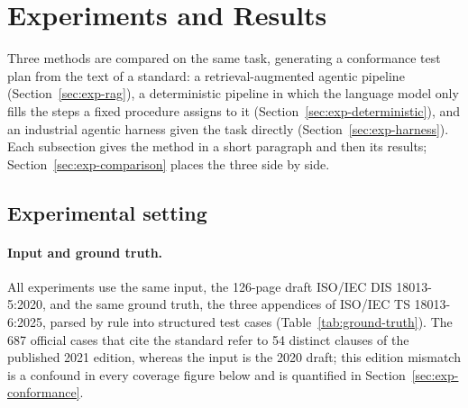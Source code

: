 \providecommand{\tbd}{\textit{tbd}}

\section{Experiments and Results}
\label{sec:experiments}

Three methods are compared on the same task, generating a conformance test
plan from the text of a standard: a retrieval-augmented agentic pipeline
(Section~\ref{sec:exp-rag}), a deterministic pipeline in which the language
model only fills the steps a fixed procedure assigns to it
(Section~\ref{sec:exp-deterministic}), and an industrial agentic harness
given the task directly (Section~\ref{sec:exp-harness}). Each subsection
gives the method in a short paragraph and then its results;
Section~\ref{sec:exp-comparison} places the three side by side.

\subsection{Experimental setting}
\label{sec:exp-setting}

\paragraph{Input and ground truth.}
All experiments use the same input, the 126-page draft ISO/IEC DIS
18013-5:2020, and the same ground truth, the three appendices of ISO/IEC TS
18013-6:2025, parsed by rule into structured test cases
(Table~\ref{tab:ground-truth}). The 687 official cases that cite the standard
refer to 54 distinct clauses of the published 2021 edition, whereas the input
is the 2020 draft; this edition mismatch is a confound in every coverage
figure below and is quantified in Section~\ref{sec:exp-conformance}.

